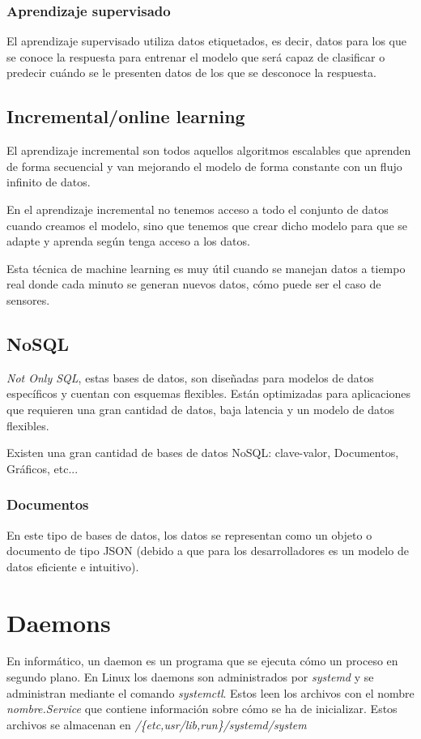 \subsubsection{Aprendizaje supervisado}
El aprendizaje supervisado utiliza datos etiquetados, es decir, datos para los que se conoce la respuesta para entrenar el modelo que será capaz de clasificar o predecir cuándo se le presenten datos de los que se desconoce la respuesta. 


\subsection{Incremental/online learning}

El aprendizaje incremental son todos aquellos algoritmos escalables que aprenden de forma secuencial y van mejorando el modelo de forma constante con un flujo infinito de datos.

En el aprendizaje incremental no tenemos acceso a todo el conjunto de datos cuando creamos el modelo, sino que tenemos que crear dicho modelo para que se adapte y aprenda según tenga acceso a los datos. 

Esta técnica de machine learning es muy útil cuando se manejan datos a tiempo real donde cada minuto se generan nuevos datos, cómo puede ser el caso de sensores.


\subsection{NoSQL}

\textit{Not Only SQL}, estas bases de datos, son diseñadas para modelos de datos específicos y cuentan con esquemas flexibles. Están optimizadas para aplicaciones que requieren una gran cantidad de datos, baja latencia y un modelo de datos flexibles.

Existen una gran cantidad de bases de datos NoSQL: clave-valor, Documentos, Gráficos, etc...

\subsubsection{Documentos}

En este tipo de bases de datos, los datos se representan como un objeto o documento de tipo JSON (debido a que para los desarrolladores es un modelo de datos eficiente e intuitivo).\cite{pagina:AWS_NoSQL}


\section{Daemons}

En informático, un daemon es un programa que se ejecuta cómo un proceso en segundo plano.
En Linux los daemons son administrados por \textit{systemd} y se administran mediante el comando \textit{systemctl}. Estos leen los archivos con el nombre \textit{nombre.Service} que contiene información sobre cómo se ha de inicializar. Estos archivos se almacenan en \textit{/\{etc,usr/lib,run\}/systemd/system}\cite{pagina:daemons_linux}
